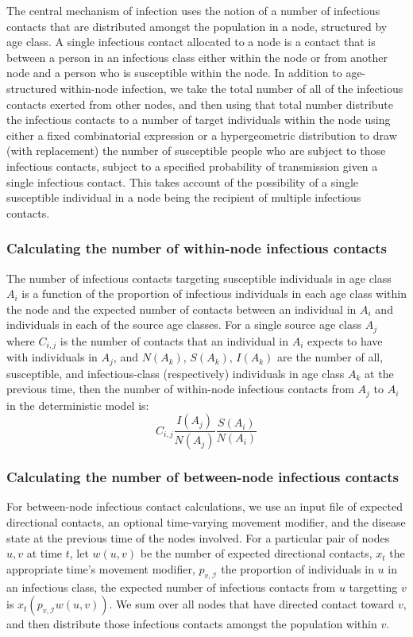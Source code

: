 \documentclass[11pt]{article}
\begin{document}
The central mechanism of infection uses the notion of a number of infectious contacts that are distributed amongst the population in a node, structured by age class.  A single infectious contact allocated to a node is a contact that is between a person in an infectious class either within the node or from another node and a person who is susceptible within the node.  In addition to age-structured within-node infection, we take the total number of all of the infectious contacts exerted from other nodes, and then using that total number distribute the infectious contacts to a number of target individuals within the node using either a fixed combinatorial expression or a hypergeometric distribution to draw (with replacement) the number of susceptible people who are subject to those infectious contacts, subject to a specified probability of transmission given a single infectious contact.  This takes account of the possibility of a single susceptible individual in a node being the recipient of multiple infectious contacts.  

\subsubsection{Calculating the number of within-node infectious contacts}

The number of infectious contacts targeting susceptible individuals in age class $A_i$ is a function of the proportion of infectious individuals in each age class within the node and the expected number of contacts between an individual in $A_i$ and individuals in each of the source age classes. For a single source age class $A_j$ where $C_{i,j}$ is the number of contacts that an individual in $A_i$ expects to have with individuals in $A_j$, and $N(A_k)$, $S(A_k)$, $I(A_k)$ are the number of all, susceptible, and infectious-class (respectively) individuals in age class $A_k$ at the previous time, then the number of within-node infectious contacts from $A_j$ to $A_i$ in the deterministic model is: 
$$
C_{i,j}\frac{I(A_j)}{N(A_j)}\frac{S(A_i)}{N(A_i)}
$$

\subsubsection{Calculating the number of between-node infectious contacts}

For between-node infectious contact calculations, we use an input file of expected directional contacts, an optional time-varying movement modifier, and the disease state at the previous time of the nodes involved.  For a particular pair of nodes $u, v$ at time $t$, let $w(u, v)$ be the number of expected directional contacts, $x_t$ the appropriate time's movement modifier, $p_{v,\mathcal{I}}$ the proportion of individuals in $u$ in an infectious class, the expected number of infectious contacts from $u$ targetting $v$ is $x_t(p_{v,\mathcal{I}}w(u, v))$.  We sum over all nodes that have directed contact toward $v$, and then distribute those infectious contacts amongst the population within $v$.
\end{document}
